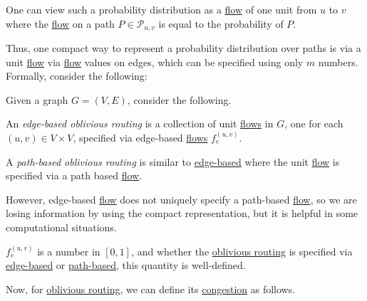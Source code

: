 \begin{intuition}
	One can view such a probability distribution as a \hyperref[def:flow]{flow} of one unit from \(u\) to \(v\) where the \hyperref[def:flow]{flow} on a path \(P\in \mathcal{P} _{u, v}\) is equal to the probability of \(P\).
\end{intuition}

Thus, one compact way to represent a probability distribution over paths is via a unit \hyperref[def:flow]{flow} via \hyperref[def:flow]{flow} values on edges, which can be specified using only \(m\) numbers. Formally, consider the following:

\begin{definition}\label{def:oblivious-routing-scheme}
	Given a graph \(G = (V, E)\), consider the following.
	\begin{definition}\label{def:edge-based-oblivious-routing}
		An \emph{edge-based oblivious routing} is a collection of unit \hyperref[def:flow]{flows} in \(G\), one for each \((u, v) \in V \times V\), specified via edge-based \hyperref[def:flow]{flows} \(f_e^{(u, v)}\).
	\end{definition}

	\begin{definition}\label{def:path-based-oblivious-routing}
		A \emph{path-based oblivious routing} is similar to \hyperref[def:edge-based-oblivious-routing]{edge-based} where the unit \hyperref[def:flow]{flow} is specified via a path based \hyperref[def:flow]{flow}.
	\end{definition}
\end{definition}

However, edge-based \hyperref[def:flow]{flow} does not uniquely specify a path-based \hyperref[def:flow]{flow}, so we are losing information by using the compact representation, but it is helpful in some computational situations.

\begin{note}
	\(f_e^{(u, v)}\) is a number in \([0, 1]\), and whether the \hyperref[def:oblivious-routing-scheme]{oblivious routing} is specified via \hyperref[def:edge-based-oblivious-routing]{edge-based} or \hyperref[def:path-based-oblivious-routing]{path-based}, this quantity is well-defined.
\end{note}

Now, for \hyperref[def:oblivious-routing-scheme]{oblivious routing}, we can define its \hyperref[def:congestion]{congestion} as follows.


